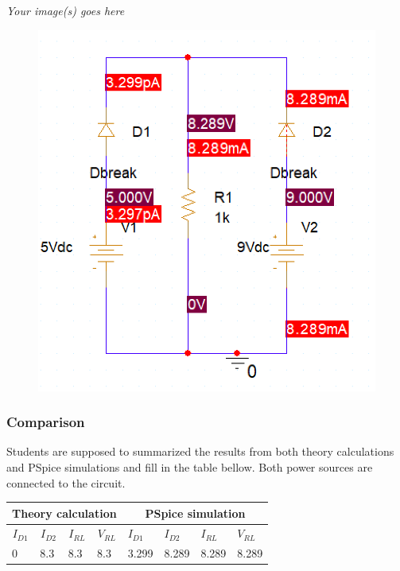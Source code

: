 \textit{Your image(s) goes here}
\begin{figure}[!htp]
    \centering
    \includegraphics[width = 500px]{source/picture/bai_2/sim_ex5.png}
    \label{sim_ex5}
\end{figure}
\newpage
\vspace{8cm}

\subsubsection{Comparison}
Students are supposed to summarized the results from both theory calculations and PSpice simulations and fill in the table bellow. Both power sources are connected to the circuit.\\

\begin{center}
    \begin{tabular}{|l|l|l|l|l|l|l|l|}
        \hline
        \multicolumn{4}{|c|}{Theory calculation} & \multicolumn{4}{c|}{PSpice simulation}                                                                                                             \\ \hline
        \multicolumn{1}{|c|}{$I_{D1}$}           & \multicolumn{1}{c|}{$I_{D2}$}          & \multicolumn{1}{c|}{$I_{RL}$} & \multicolumn{1}{c|}{$V_{RL}$} & $I_{D1}$ & $I_{D2}$ & $I_{RL}$ & $V_{RL}$ \\ \hline
        0                                        & 8.3                                    & 8.3                           & 8.3                           & 3.299    & 8.289    & 8.289    & 8.289    \\ \hline
    \end{tabular}
\end{center}


